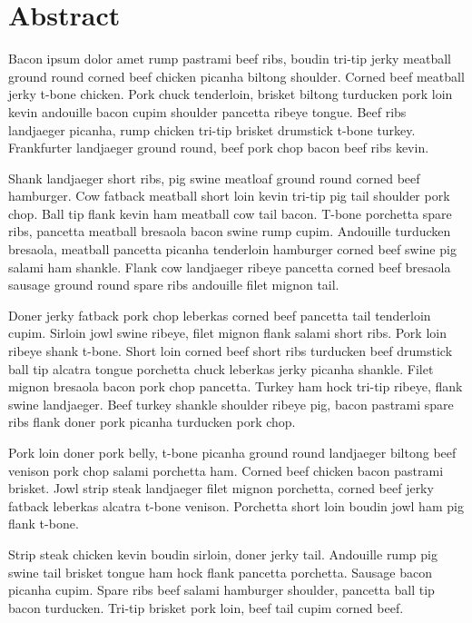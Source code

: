 \chapter{Abstract}

\setcounter{page}{1}

Bacon ipsum dolor amet rump pastrami beef ribs, boudin tri-tip jerky meatball ground round corned beef chicken picanha biltong shoulder. Corned beef meatball jerky t-bone chicken. Pork chuck tenderloin, brisket biltong turducken pork loin kevin andouille bacon cupim shoulder pancetta ribeye tongue. Beef ribs landjaeger picanha, rump chicken tri-tip brisket drumstick t-bone turkey. Frankfurter landjaeger ground round, beef pork chop bacon beef ribs kevin.

Shank landjaeger short ribs, pig swine meatloaf ground round corned beef hamburger. Cow fatback meatball short loin kevin tri-tip pig tail shoulder pork chop. Ball tip flank kevin ham meatball cow tail bacon. T-bone porchetta spare ribs, pancetta meatball bresaola bacon swine rump cupim. Andouille turducken bresaola, meatball pancetta picanha tenderloin hamburger corned beef swine pig salami ham shankle. Flank cow landjaeger ribeye pancetta corned beef bresaola sausage ground round spare ribs andouille filet mignon tail.

Doner jerky fatback pork chop leberkas corned beef pancetta tail tenderloin cupim. Sirloin jowl swine ribeye, filet mignon flank salami short ribs. Pork loin ribeye shank t-bone. Short loin corned beef short ribs turducken beef drumstick ball tip alcatra tongue porchetta chuck leberkas jerky picanha shankle. Filet mignon bresaola bacon pork chop pancetta. Turkey ham hock tri-tip ribeye, flank swine landjaeger. Beef turkey shankle shoulder ribeye pig, bacon pastrami spare ribs flank doner pork picanha turducken pork chop.

Pork loin doner pork belly, t-bone picanha ground round landjaeger biltong beef venison pork chop salami porchetta ham. Corned beef chicken bacon pastrami brisket. Jowl strip steak landjaeger filet mignon porchetta, corned beef jerky fatback leberkas alcatra t-bone venison. Porchetta short loin boudin jowl ham pig flank t-bone.

Strip steak chicken kevin boudin sirloin, doner jerky tail. Andouille rump pig swine tail brisket tongue ham hock flank pancetta porchetta. Sausage bacon picanha cupim. Spare ribs beef salami hamburger shoulder, pancetta ball tip bacon turducken. Tri-tip brisket pork loin, beef tail cupim corned beef.